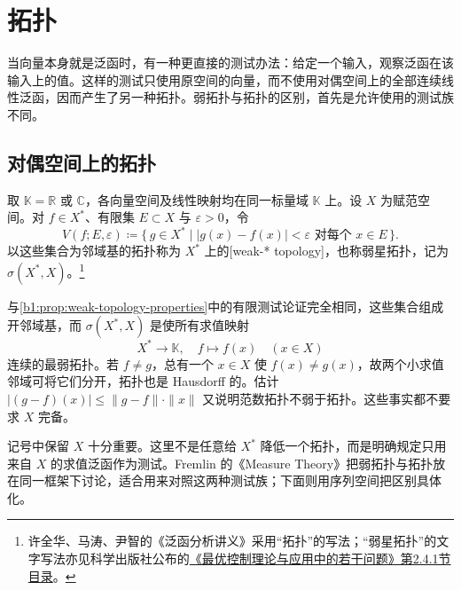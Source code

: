 \section{\WeakStar{}拓扑}
\label{b1:sec:0902}

当向量本身就是泛函时，有一种更直接的测试办法：给定一个输入，观察泛函在该输入上的值。这样的测试只使用原空间的向量，而不使用对偶空间上的全部连续线性泛函，因而产生了另一种拓扑。弱拓扑与\WeakStar{}拓扑的区别，首先是允许使用的测试族不同。

\subsection{对偶空间上的\WeakStar{}拓扑}
\label{b1:subsec:090201}

\begin{definition}\label{b1:def:weak-star-topology}
取 \(\mathbb K=\mathbb R\) 或 \(\mathbb C\)，各向量空间及线性映射均在同一标量域 \(\mathbb K\) 上。设 \(X\) 为赋范空间。对 \(f\in X^*\)、有限集 \(E\subset X\) 与 \(\varepsilon>0\)，令
\[
 V(f;E,\varepsilon)
 \coloneqq\{\,g\in X^*\mid |g(x)-f(x)|<\varepsilon\text{ 对每个 }x\in E\,\}.
\]
以这些集合为邻域基的拓扑称为 \(X^*\) 上的[weak-* topology]，也称弱星拓扑，记为 \(\sigma(X^*,X)\)。\footnote{许全华、马涛、尹智的《泛函分析讲义》\cite[第八章]{Xu2017Fanhan}采用“\WeakStar{}拓扑”的写法；“弱星拓扑”的文字写法亦见科学出版社公布的\href{https://www.ecsponline.com/goods.php?id=41308}{《最优控制理论与应用中的若干问题》第2.4.1节目录}。}
\end{definition}

与\cref{b1:prop:weak-topology-properties}中的有限测试论证完全相同，这些集合组成开邻域基，而 \(\sigma(X^*,X)\) 是使所有求值映射
\[
 X^*\longrightarrow\mathbb K,\quad f\longmapsto f(x)\quad(x\in X)
\]
连续的最弱拓扑。若 \(f\ne g\)，总有一个 \(x\in X\) 使 \(f(x)\ne g(x)\)，故两个小求值邻域可将它们分开，\WeakStar{}拓扑也是 Hausdorff 的。估计 \(|(g-f)(x)|\leq\|g-f\|\cdot\|x\|\) 又说明范数拓扑不弱于\WeakStar{}拓扑。这些事实都不要求 \(X\) 完备。

\ProseParagraphBreak

记号中保留 \(X\) 十分重要。这里不是任意给 \(X^*\) 降低一个拓扑，而是明确规定只用来自 \(X\) 的求值泛函作为测试。Fremlin 的《Measure Theory》\cite[Appendix to Volume 2, 2A5I]{Fremlin2016Measure}把弱拓扑与\WeakStar{}拓扑放在同一框架下讨论，适合用来对照这两种测试族；下面则用序列空间把区别具体化。

